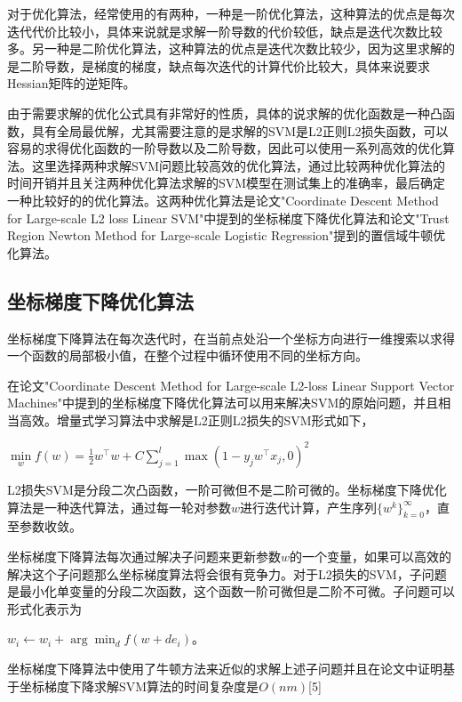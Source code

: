 \documentclass[master]{njuthesis}
\begin{document}
    对于优化算法，经常使用的有两种，一种是一阶优化算法，这种算法的优点是每次迭代代价比较小，具体来说就是求解一阶导数的代价较低，缺点是迭代次数比较多。另一种是二阶优化算法，这种算法的优点是迭代次数比较少，因为这里求解的是二阶导数，是梯度的梯度，缺点每次迭代的计算代价比较大，具体来说要求Hessian矩阵的逆矩阵。
    
    由于需要求解的优化公式具有非常好的性质，具体的说求解的优化函数是一种凸函数，具有全局最优解，尤其需要注意的是求解的SVM是L2正则L2损失函数，可以容易的求得优化函数的一阶导数以及二阶导数，因此可以使用一系列高效的优化算法。这里选择两种求解SVM问题比较高效的优化算法，通过比较两种优化算法的时间开销并且关注两种优化算法求解的SVM模型在测试集上的准确率，最后确定一种比较好的的优化算法。这两种优化算法是论文"Coordinate Descent Method for Large-scale L2 loss Linear SVM"中提到的坐标梯度下降优化算法和论文"Trust Region Newton Method for Large-scale Logistic Regression"提到的置信域牛顿优化算法。

\subsection{坐标梯度下降优化算法}
    
    坐标梯度下降算法在每次迭代时，在当前点处沿一个坐标方向进行一维搜索以求得一个函数的局部极小值，在整个过程中循环使用不同的坐标方向。

    在论文"Coordinate Descent Method for Large-scale L2-loss Linear Support Vector Machines"\cite{CDM}中提到的坐标梯度下降优化算法可以用来解决SVM的原始问题，并且相当高效。增量式学习算法中求解是L2正则L2损失的SVM形式如下，

    $\min\limits_{w} f\left(w\right) = \frac{1}{2}w^\intercal w+ C\sum_{j=1}^l \max\left(1-y_jw^\intercal x_j,0\right)^2$
    
    L2损失SVM是分段二次凸函数，一阶可微但不是二阶可微的。坐标梯度下降优化算法是一种迭代算法，通过每一轮对参数$w$进行迭代计算，产生序列$\{w^k\}_{k=0}^{\infty}$，直至参数收敛。
    
    坐标梯度下降算法每次通过解决子问题来更新参数$w$的一个变量，如果可以高效的解决这个子问题那么坐标梯度算法将会很有竞争力。对于L2损失的SVM，子问题是最小化单变量的分段二次函数，这个函数一阶可微但是二阶不可微。子问题可以形式化表示为     

    $w_i \leftarrow w_i + \arg\min_{d} f\left(w+de_i\right)$。
    
    坐标梯度下降算法中使用了牛顿方法来近似的求解上述子问题并且在论文中证明基于坐标梯度下降求解SVM算法的时间复杂度是$O\left(nm\right)$[5]
\end{document}
